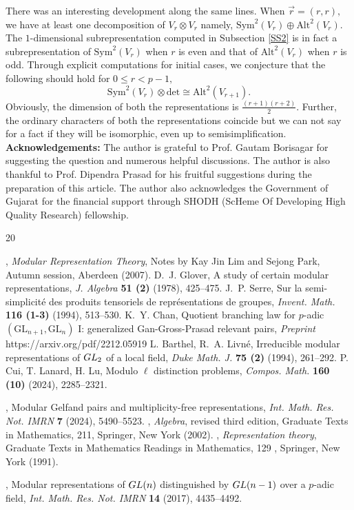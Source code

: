 \documentclass[10pt, reqno]{amsart}
\numberwithin{equation}{section}
\theoremstyle{remark}
\begin{document}
	There was an interesting development along the same lines. When $\Vec{r}=(r,r),$ we have at least one decomposition of $V_r\otimes V_r$ namely, $\text{Sym}^2(V_r)\oplus \text{Alt}^2(V_r).$ The $1\text{-dimensional}$ subrepresentation computed in Subsection \ref{SS2} is in fact a subrepresentation of $\text{Sym}^2(V_r)$ when $r$ is even and that of $\text{Alt}^2(V_r)$ when $r$ is odd. Through explicit computations for initial cases, we conjecture that the following should hold for $0\leq r<p-1,$
	$$\text{Sym}^2(V_r)\otimes\mathrm{det}\cong \text{Alt}^2(V_{r+1}).$$
	Obviously, the dimension of both the representations is $\frac{(r+1)(r+2)}{2}.$ Further, the ordinary characters of both the representations coincide but we can not say for a fact if they will be isomorphic, even up to semisimplification.\\
    
 \vspace{5mm}
        {\noindent \bf Acknowledgements:} The author is grateful to Prof. Gautam Borisagar for suggesting the question and numerous helpful discussions. The author is also thankful to Prof. Dipendra Prasad for his fruitful suggestions during the preparation of this article. The author also acknowledges the Government of Gujarat for the financial support through SHODH (ScHeme Of Developing High Quality Research) fellowship.

\begin{thebibliography}{20}

 , {\it Modular Representation Theory}, Notes by Kay Jin Lim and Sejong Park, Autumn session, Aberdeen (2007).
		 {\sc D.~J. Glover}, A study of certain modular representations, {\it J. Algebra} {\bf 51 (2)} (1978), 425--475.
		 {\sc J.~P. Serre}, Sur la semi-simplicit\'e{} des produits tensoriels de repr\'esentations de groupes, {\it Invent. Math.} {\bf 116 (1-3)} (1994), 513--530.
         {\sc K.~Y. Chan}, Quotient branching law for $p$-adic $(\mathrm{GL}_{n+1}, \mathrm{GL}_n)$ I: generalized Gan-Gross-Prasad relevant pairs, {\it Preprint} https://arxiv.org/pdf/2212.05919
		 {\sc L. Barthel, R.~A. Livn\'e}, Irreducible modular representations of ${\rm GL}_2$ of a local field, {\it Duke Math. J.} {\bf 75 (2)} (1994), 261--292.
         {\sc P. Cui, T. Lanard, H. Lu}, Modulo $\ell$ distinction problems, {\it Compos. Math.} {\bf 160 (10)} (2024), 2285--2321.

		, Modular Gelfand pairs and multiplicity-free representations, {\it Int. Math. Res. Not. IMRN} {\bf 7} (2024), 5490--5523.
		, {\it Algebra}, revised third edition, Graduate Texts in Mathematics, 211, Springer, New York (2002).
		, {\it Representation theory}, Graduate Texts in Mathematics Readings in Mathematics, 129 , Springer, New York (1991).
		
        , Modular representations of ${\rm GL}(n)$ distinguished by ${\rm GL}(n-1)$ over a $p$-adic field, {\it Int. Math. Res. Not. IMRN} {\bf 14} (2017), 4435--4492.

\end{thebibliography}
\end{document}
